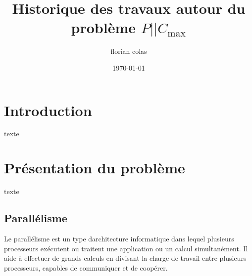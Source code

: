 \documentclass[a4paper,12pt]{report}
\title{Historique des travaux autour du problème $P||C_{\max}$}
\author{florian colas}
\date{\today}
\theoremstyle{plain}				%
\theoremstyle{definition}				%
\begin{document}
\maketitle

%
%
%
\renewcommand{\thesection}{\arabic{section}}
\renewcommand{\contentsname}{Sommaire}
\setcounter{tocdepth}{4}	%
\setcounter{secnumdepth}{3}	%
\tableofcontents

\section{Introduction}

texte


\section{Présentation du problème}
texte
\subsection{Parallélisme}
Le parallélisme est un type d{\textquotesingle}architecture informatique
dans lequel plusieurs processeurs exécutent ou traitent une application
ou un calcul simultanément. Il aide à effectuer de grands calculs en
divisant la charge de travail entre plusieurs processeurs, capables de communiquer et de coopérer.
\end{document}

